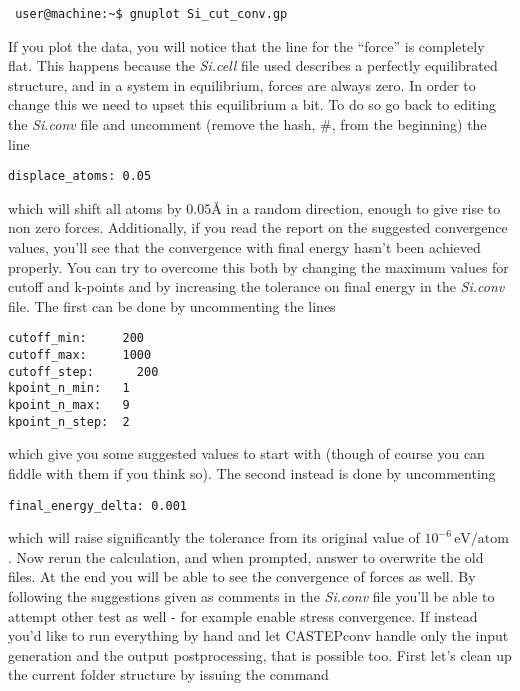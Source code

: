\documentclass[10pt]{article}
\begin{document}
\begin{lstlisting}
 user@machine:~$ gnuplot Si_cut_conv.gp
\end{lstlisting}

If you plot the data, you will notice that the line for the ``force'' is completely flat. This happens because the \textit{Si.cell} file used describes a perfectly equilibrated structure, and in a system in equilibrium, forces are always zero. In order to change this we need to upset this equilibrium a bit. To do so go back to editing the \textit{Si.conv} file and uncomment (remove the hash, \#, from the beginning) the line

\begin{lstlisting}
displace_atoms: 0.05
\end{lstlisting}

which will shift all atoms by $0.05 $\AA{} in a random direction, enough to give rise to non zero forces. Additionally, if you read the report on the suggested convergence values, you'll see that the convergence with final energy hasn't been achieved properly. You can try to overcome this both by changing the maximum values for cutoff and k-points and by increasing the tolerance on final energy in the \textit{Si.conv} file. The first can be done by uncommenting the lines

\begin{lstlisting}
cutoff_min:     200
cutoff_max:     1000
cutoff_step:	  200
kpoint_n_min:   1
kpoint_n_max:   9
kpoint_n_step:  2
\end{lstlisting}

which give you some suggested values to start with (though of course you can fiddle with them if you think so). The second instead is done by uncommenting

\begin{lstlisting}
final_energy_delta:	0.001
\end{lstlisting}

which will raise significantly the tolerance from its original value of $10^{-6}\,\mathrm{eV/atom}$.\newline
Now rerun the calculation, and when prompted, answer to overwrite the old files. At the end you will be able to see the convergence of forces as well. By following the suggestions given as comments in the \textit{Si.conv} file you'll be able to attempt other test as well - for example enable stress convergence.\newline
If instead you'd like to run everything by hand and let CASTEPconv handle only the input generation and the output postprocessing, that is possible too. First let's clean up the current folder structure by issuing the command
\end{document}
